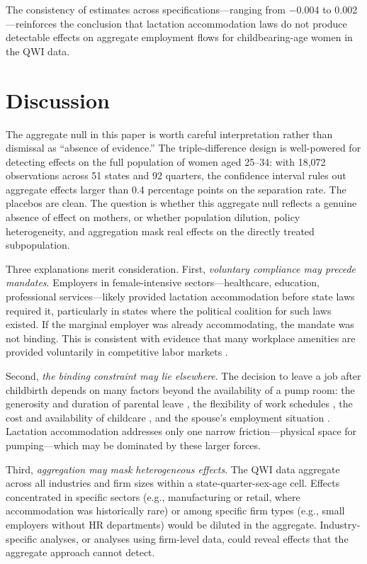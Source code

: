 \documentclass[12pt]{article}
\begin{document}
The consistency of estimates across specifications---ranging from $-$0.004 to 0.002---reinforces the conclusion that lactation accommodation laws do not produce detectable effects on aggregate employment flows for childbearing-age women in the QWI data.


\section{Discussion}
\label{sec:discussion}

The aggregate null in this paper is worth careful interpretation rather than dismissal as ``absence of evidence.'' The triple-difference design is well-powered for detecting effects on the full population of women aged 25--34: with 18,072 observations across 51 states and 92 quarters, the confidence interval rules out aggregate effects larger than 0.4 percentage points on the separation rate. The placebos are clean. The question is whether this aggregate null reflects a genuine absence of effect on mothers, or whether population dilution, policy heterogeneity, and aggregation mask real effects on the directly treated subpopulation.

Three explanations merit consideration. First, \emph{voluntary compliance may precede mandates}. Employers in female-intensive sectors---healthcare, education, professional services---likely provided lactation accommodation before state laws required it, particularly in states where the political coalition for such laws existed. If the marginal employer was already accommodating, the mandate was not binding. This is consistent with evidence that many workplace amenities are provided voluntarily in competitive labor markets \citep{mas2017}.

Second, \emph{the binding constraint may lie elsewhere}. The decision to leave a job after childbirth depends on many factors beyond the availability of a pump room: the generosity and duration of parental leave \citep{rossinslater2018}, the flexibility of work schedules \citep{goldin2014}, the cost and availability of childcare \citep{blau2001, herbst2017}, and the spouse's employment situation \citep{angelov2016}. Lactation accommodation addresses only one narrow friction---physical space for pumping---which may be dominated by these larger forces.

Third, \emph{aggregation may mask heterogeneous effects}. The QWI data aggregate across all industries and firm sizes within a state-quarter-sex-age cell. Effects concentrated in specific sectors (e.g., manufacturing or retail, where accommodation was historically rare) or among specific firm types (e.g., small employers without HR departments) would be diluted in the aggregate. Industry-specific analyses, or analyses using firm-level data, could reveal effects that the aggregate approach cannot detect.
\end{document}
